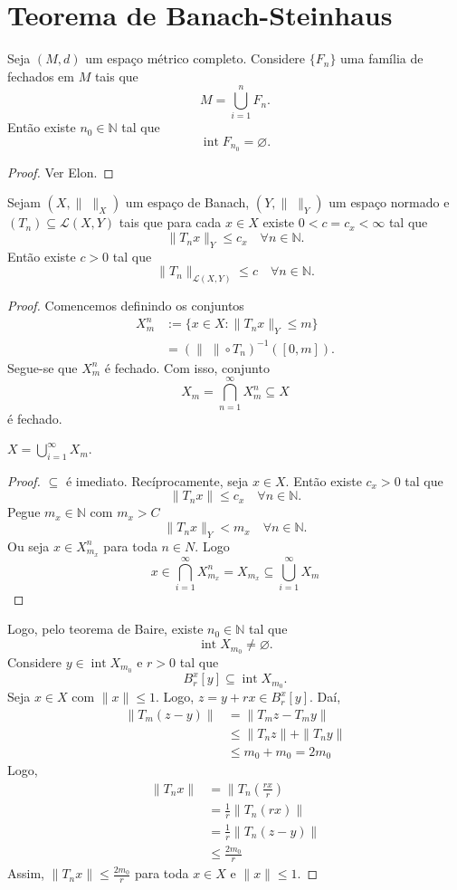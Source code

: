 \documentclass[portuguese]{article}
\theoremstyle{definition}
\newcommand{\N}{\mathbb{N}}
\begin{document}
	\section{Teorema de Banach-Steinhaus}
	\begin{teo}[Baire]
		Seja $(M,d)$ um espaço métrico completo. Considere $\{F_n\}$ uma família de fechados em $M$ tais que
		\[M=\bigcup_{i=1}^nF_n.\]
		Então existe $n_0\in\N$ tal que
		\[\operatorname{int} F_{n_0}=\varnothing.\]
	\end{teo}
	\begin{proof}
		Ver Elon.
	\end{proof}
	\begin{teo}
		Sejam $(X,\|\;\|_X)$ um espaço de Banach, $(Y,\|\;\|_Y)$ um espaço normado e $(T_n)\subseteq\mathcal{L}(X,Y)$ tais que para cada $x\in X$ existe $0<c=c_x<\infty$ tal que
		\[\| T_nx\|_Y\leq c_x\quad\forall n\in\N.\]
		Então existe $c>0$ tal que
		\[\| T_n\|_{\mathcal{L}(X,Y)}\leq c\quad\forall n\in\N.\]
	\end{teo}
	\begin{proof}
		Comencemos definindo os conjuntos
		\begin{align*}
			X_m^n&:=\{x\in X:\| T_nx\|_Y\leq m\}\\
			&=\left(\|\;\|\circ T_n\right)^{-1}([0,m]).
		\end{align*}
		Segue-se que $X_m^n$ é fechado. Com isso, conjunto
		\[X_m=\bigcap_{n=1}^\infty X_m^n\subseteq X\]
		é fechado.
		\begin{af*}
			$X=\bigcup_{i=1}^\infty X_m$.
		\end{af*}
		\begin{proof}
			$\subseteq$ é imediato. Recíprocamente, seja $x\in X$. Então existe $c_x>0$ tal que
			\[\| T_nx\|\leq c_x\quad\forall n\in\N.\]
			Pegue $m_x\in\N$ com $m_x>C$
			\[\| T_nx\|_Y<m_x\quad\forall n\in\N.\]
			Ou seja $x\in X_{m_x}^n$ para toda $n\in N$.
			Logo
			\[x\in \bigcap_{i=1}^\infty X_{m_x}^n=X_{m_x}\subseteq \bigcup_{i=1}^\infty X_m\]
		\end{proof}
		Logo, pelo teorema de Baire, existe $n_0\in\N$ tal que
		\[\operatorname{int}X_{m_0}\neq\varnothing.\]
		Considere $y\in\operatorname{int}X_{m_0}$ e $r>0$ tal que
		\[B^x_r[y]\subseteq\operatorname{int}X_{m_0}.\]
		Seja $x\in X$ com $\| x\|\leq1$. Logo, $z=y+rx\in B_r^x[y]$. Daí,
		\begin{align*}
			\| T_m(z-y)\|&=\| T_mz-T_my\|\\
			&\leq\| T_nz\|+\| T_ny\|\\
			&\leq m_0+m_0=2m_0
		\end{align*}
		Logo,
		\begin{align*}
			\| T_nx\|&=\| T_n\left(\frac{rx}{r}\right)\\
			&=\frac{1}{r}\| T_n(rx)\|\\
			&=\frac{1}{r}\| T_n(z-y)\|\\
			&\leq\frac{2m_0}{r}
		\end{align*}
		Assim, $\| T_nx\|\leq\frac{2m_0}{r}$ para toda $x\in X$ e $\| x\|\leq1$.
	\end{proof}
\end{document}
